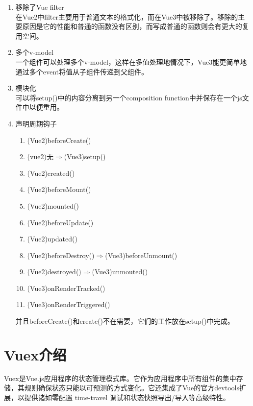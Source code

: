 \begin{enumerate}
\begin{enumerate}
          \item 移除了Vue filter\\
                在Vue2中filter主要用于普通文本的格式化，而在Vue3中被移除了。移除的主要原因是它的性能和普通的函数没有区别，而写成普通的函数则会有更大的复用空间。
          \item 多个v-model\\
                一个组件可以处理多个v-model，这样在多值处理地情况下，Vue3能更简单地通过多个event将值从子组件传递到父组件。
          \item 模块化\\
                可以将setup()中的内容分离到另一个composition function中并保存在一个js文件中以便重用。
          \item 声明周期钩子
                \begin{enumerate}
                  \item (Vue2)beforeCreate()
                  \item (vue2)无$\Rightarrow$(Vue3)setup()
                  \item (Vue2)created()
                  \item (Vue2)beforeMount()
                  \item (Vue2)mounted()
                  \item (Vue2)beforeUpdate()
                  \item (Vue2)updated()
                  \item (Vue2)beforeDestroy()$\Rightarrow$(Vue3)beforeUnmount()
                  \item (Vue2)destroyed()$\Rightarrow$(Vue3)unmouted()
                  \item (Vue3)onRenderTracked()
                  \item (Vue3)onRenderTriggered()
                \end{enumerate}
                并且beforeCreate()和create()不在需要，它们的工作放在setup()中完成。
        \end{enumerate}
\end{enumerate}

\section{Vuex介绍}

Vuex是Vue.js应用程序的状态管理模式库。它作为应用程序中所有组件的集中存储，其规则确保状态只能以可预测的方式变化。它还集成了Vue的官方devtools扩展，以提供诸如零配置 time-travel 调试和状态快照导出/导入等高级特性。

